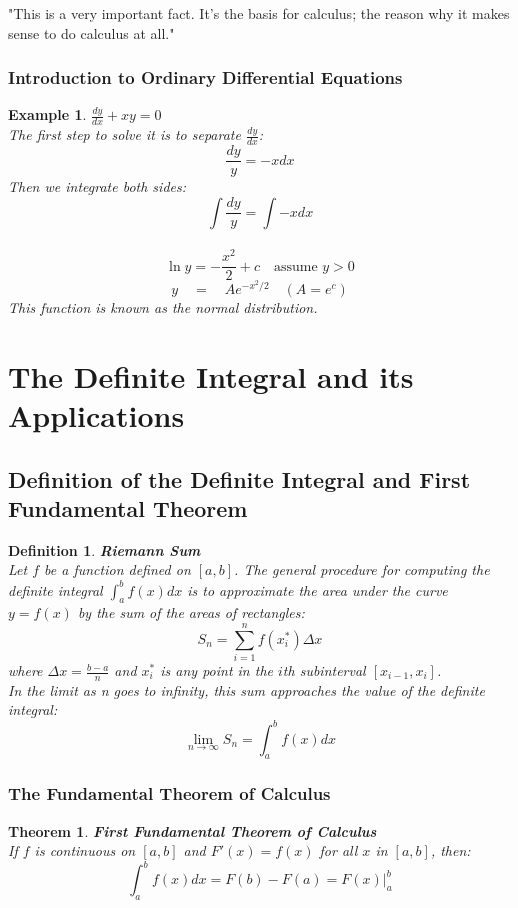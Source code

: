 \documentclass[10pt, a4paper]{article}
\newtheorem{theorem}{Theorem}
\newtheorem{definition}{Definition}
\newtheorem{example}{Example}
\begin{document}
"This is a very important fact. It's the basis for calculus; the reason why it makes sense to do calculus at all."

\subsubsection*{Introduction to Ordinary Differential Equations}
\begin{example}
    \textbf{$\frac{dy}{dx} + xy  = 0$} \\
    The first step to solve it is to separate $\frac{dy}{dx}$:
    \[\frac{dy}{y} = -xdx\]
    Then we integrate both sides:
    \[\int\frac{dy}{y} = \int-xdx\]\
    \[\ln y = -\frac{x^2}{2} + c \quad\text{assume } y > 0\]
    \[ y\quad=\quad Ae^{-x^2/2}\quad(A=e^c) \]
    This function is known as the normal distribution.
\end{example}

\section{The Definite Integral and its Applications}
\subsection{Definition of the Definite Integral and First Fundamental Theorem}
\begin{definition}
    \textbf{Riemann Sum} \\
    Let $f$ be a function defined on $[a, b]$. The general procedure for computing the definite integral 
    $\int_a^bf(x)dx$ is to approximate the area under the curve $y = f(x)$ by the sum of the areas of rectangles:
    \[S_n = \sum_{i=1}^nf(x_i^*)\Delta x\]
    where $\Delta x = \frac{b - a}{n}$ and $x_i^*$ is any point in the $i$th subinterval $[x_{i-1}, x_i]$.\\
    In the limit as n goes to infinity, this sum approaches the value of the definite integral:
    \[\lim_{n\to\infty}S_n = \int_a^bf(x)dx\]
\end{definition}

\subsubsection*{The Fundamental Theorem of Calculus}
\begin{theorem}
    \textbf{First Fundamental Theorem of Calculus} \\
    If $f$ is continuous on $[a, b]$ and $F'(x) = f(x)$ for all $x$ in $[a, b]$, then:
    \[\boxed{\int_a^bf(x)dx = F(b) - F(a) = F(x) \Big|_a^b}\]
\end{theorem}
\end{document}
